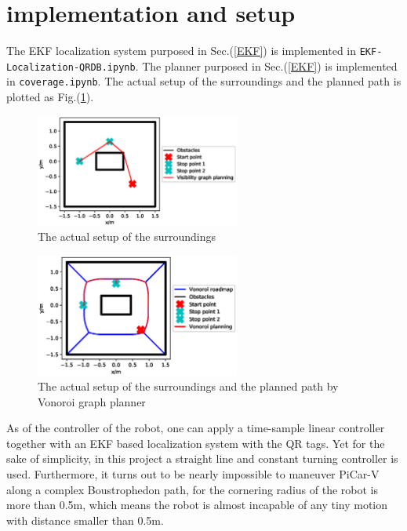 \documentclass[12pt]{article}
\begin{document}
\section{implementation and setup}
The EKF localization system purposed in Sec.(\ref{EKF}) is implemented in \texttt{EKF-Localization-QRDB.ipynb}. The planner purposed in Sec.(\ref{EKF}) is implemented in \texttt{coverage.ipynb}. The actual setup of the surroundings and the planned path is plotted as Fig.(\ref{vis}).

\begin{figure}[htbp]
\centering
\includegraphics[width=0.6\textwidth]{../figs/visibility_graph_planning.eps}
\caption{The actual setup of the surroundings}\label{vis}
\end{figure}

\begin{figure}[htbp]
\centering
\includegraphics[width=0.6\textwidth]{../figs/vonoroi_planning.eps}
\caption{The actual setup of the surroundings and the planned path by Vonoroi graph planner}\label{vo}
\end{figure}

As of the controller of the robot, one can apply a time-sample linear controller together with an EKF based localization system with the QR tags. Yet for the sake of simplicity, in this project a straight line and constant turning controller is used. Furthermore, it turns out to be nearly impossible to maneuver PiCar-V along a complex 
Boustrophedon path, for the cornering radius of the robot is more than 0.5m, which means the robot is almost incapable of any tiny motion with distance smaller than 0.5m.
\end{document}
